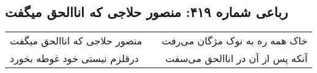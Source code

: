 \begin{center}
\section*{رباعی شماره ۴۱۹: منصور حلاجی که اناالحق میگفت}
\label{sec:0419}
\begin{longtable}{l p{0.5cm} r}
منصور حلاجی که اناالحق میگفت
&&
خاک همه ره به نوک مژگان می‌رفت
\\
درقلزم نیستی خود غوطه بخورد
&&
آنکه پس از آن در اناالحق می‌سفت
\\
\end{longtable}
\end{center}
